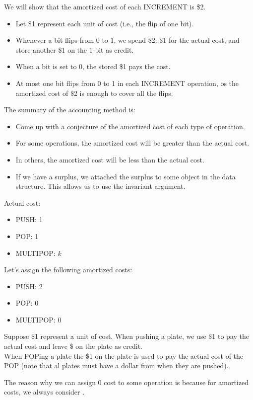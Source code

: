 \documentclass[../main/main.tex]{subfiles}
\begin{document}
We will show that the amortized cost of each INCREMENT is \$2.
\begin{itemize}
	\item Let \$1 represent each unit of cost (i.e., the flip of one bit).
	\item Whenever a bit flips from 0 to 1, we spend \$2: \$1 for the actual cost, and store another \$1 on the 1-bit as credit.
	\item When a bit is set to 0, the stored \$1 pays the cost.
	\item At most one bit flips from 0 to 1 in each INCREMENT operation, os the amortized cost of \$2 is enough to cover all the flips. 
\end{itemize}
\begin{remark}
	The summary of the accounting method is:
	\begin{itemize}
		\item Come up with a conjecture of the amortized cost of each type of operation.
		\item For some operations, the amortized cost will be greater than the actual cost.
		\item In others, the amortized cost will be less than the actual cost.
		\item If we have a surplus, we attached the surplus to some object in the data structure. This allows us to use the invariant argument.
	\end{itemize}
\end{remark}
\begin{example}
	Actual cost: 
	\begin{itemize}
		\item PUSH: 1
		\item POP: 1
		\item MULTIPOP: $k$
	\end{itemize}
	Let's assign the following amortized costs:
	\begin{itemize}
		\item PUSH: 2
		\item POP: 0
		\item MULTIPOP: 0
	\end{itemize}
	Suppose \$1 represent a unit of cost. When pushing a plate, we use \$1 to pay the actual cost and leave \$ on the plate as credit.\\

	When POPing a plate the \$1 on the plate is used to pay the actual cost of the POP (note that al plates must have a dollar from when they are pushed).

\end{example}
\begin{remark}
	The reason why we can assign 0 cost to some operation is because for amortized costs, we always consider .
\end{remark}
\end{document}
